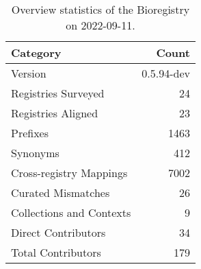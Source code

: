 \begin{table}
\centering
\caption{Overview statistics of the Bioregistry on 2022-09-11.}
\label{tab:bioregistry-summary}
\begin{tabular}{lr}
\toprule
                Category &      Count \\
\midrule
                 Version & 0.5.94-dev \\
     Registries Surveyed &         24 \\
      Registries Aligned &         23 \\
                Prefixes &       1463 \\
                Synonyms &        412 \\
 Cross-registry Mappings &       7002 \\
      Curated Mismatches &         26 \\
Collections and Contexts &          9 \\
     Direct Contributors &         34 \\
      Total Contributors &        179 \\
\bottomrule
\end{tabular}
\end{table}
